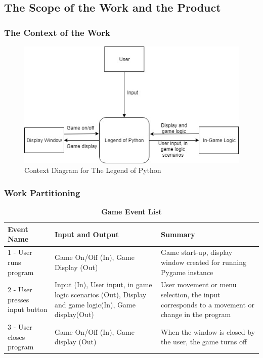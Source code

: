 \documentclass[12pt, titlepage]{article}
\begin{document}
\subsection{The Scope of the Work and the Product}
{\subsubsection{The Context of the Work}
\begin{figure}[!h]
    \centering
    \includegraphics[scale=0.5]{Context.jpg}
    \caption{\color{blue}Context Diagram for The Legend of Python}
    \label{fig:context}
\end{figure}}
\newpage
\subsubsection{Work Partitioning}
    \begin{table}[!h]
        \caption{\bf Game Event List}
        \begin{tabularx}{\textwidth}{p{4cm}p{5cm}X}
            \toprule {\bf Event Name} & {\bf Input and Output} & {\bf Summary}\\
            \midrule
            1 - User runs program & Game On/Off (In), Game Display (Out) & Game start-up, display window created for running Pygame instance\\
            2 - User presses input button & Input (In), User input, in game logic scenarios (Out), Display and game logic(In), Game display(Out) & User movement or menu selection, the input corresponds to a movement or change in the program\\
            3 - User closes program  & Game On/Off (In), Game display (Out) & When the window is closed by the user, the game turns off\\
            \bottomrule
        \end{tabularx}
    \end{table}
\end{document}
